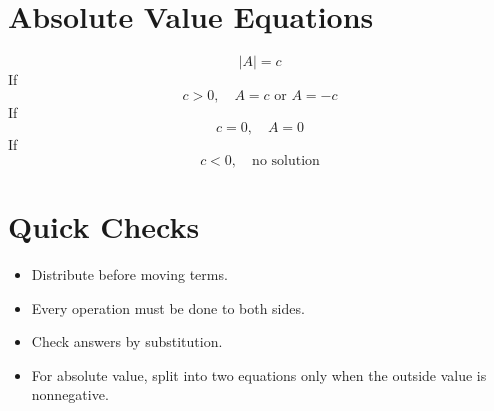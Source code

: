 \documentclass[11pt]{article}
\begin{document}
\section*{Absolute Value Equations}
\[
|A|=c
\]
If
\[
c>0,\quad A=c\text{ or }A=-c
\]
If
\[
c=0,\quad A=0
\]
If
\[
c<0,\quad \text{no solution}
\]

\section*{Quick Checks}
\begin{itemize}
  \item Distribute before moving terms.
  \item Every operation must be done to both sides.
  \item Check answers by substitution.
  \item For absolute value, split into two equations only when the outside value is nonnegative.
\end{itemize}
\end{document}
